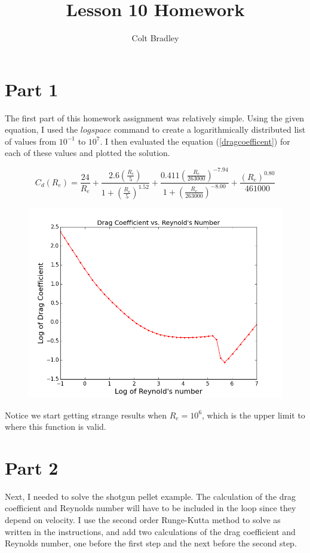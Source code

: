 \documentclass[11pt]{article}
\begin{document}
\title{Lesson 10 Homework}
\author{Colt Bradley}
\date{}
\maketitle


\section{Part 1}
The first part of this homework assignment was relatively simple. Using the given equation, I used the $logspace$ command to create a logarithmically distributed list of values from $10^{-1}$ to $10^7$. I then evaluated the equation (\ref{dragcoefficent}) for each of these values and plotted the solution. 

\begin{equation}
C_d (R_e) = \frac{24}{R_e}+\frac{2.6 (\frac{R_e}{5})}{1+(\frac{R_e}{5})^{1.52}}+\frac{0.411 (\frac{R_e}{263000})^{-7.94}}{1+(\frac{R_e}{263000})^{-8.00}}+\frac{(R_e)^{0.80}}{461000} \label{dragcoefficent}
\end{equation}

\begin{figure}[ht]
\centering
\includegraphics[scale=.5]{cdvsreplot.png}
\end{figure}

Notice we start getting strange results when $R_e = 10^6$, which is the upper limit to where this function is valid. 

\section{Part 2}
Next, I needed to solve the shotgun pellet example. The calculation of the drag coefficient and Reynolds number will have to be included in the loop since they depend on velocity. I use the second order Runge-Kutta method to solve as written in the instructions, and add two calculations of the drag coefficient and Reynolds number, one before the first step and the next before the second step. 
\end{document}
